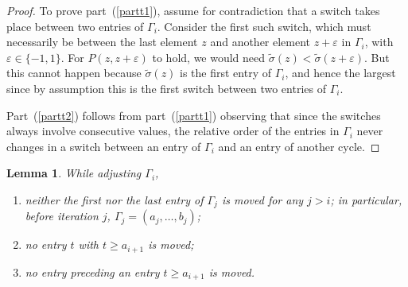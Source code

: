 \documentclass[11pt]{amsart}
\newtheorem{lemma}[theorem]{Lemma}
\newcommand\ben{\begin{enumerate}}
\newcommand\een{\end{enumerate}}
\newcommand\wt{\widetilde}
\newcommand\eps{\varepsilon}
\newcommand\sigm{\wt\sigma}
\begin{document}
\begin{proof}
To prove part~(\ref{partt1}), assume for contradiction that a switch takes place between two entries of $\Gamma_i$. Consider the first such switch, which must necessarily be
between the last element $z$ and another element $z+\eps$ in $\Gamma_i$, with $\eps\in\{-1,1\}$.
For $P(z,z+\eps)$ to hold, we would need $\sigm(z)<\sigm(z+\eps)$. But this cannot happen because $\sigm(z)$ is the first entry of $\Gamma_i$, and hence the largest since by assumption this is the first switch between two entries of $\Gamma_i$.

Part~(\ref{partt2}) follows from part~(\ref{partt1}) observing that since the switches always involve consecutive values,
the relative order of the entries in $\Gamma_i$ never changes in a switch between an entry of $\Gamma_i$ and an entry of another cycle.
\end{proof}

\begin{lemma}\label{lem:notmoved} While adjusting $\Gamma_i$, \ben
\item\label{part1} neither the first nor the last entry of $\Gamma_j$ is moved for any $j>i$; in particular, before iteration $j$, $\Gamma_j=(a_j,\dots,b_j)$;
\item\label{part2} no entry $t$ with $t\ge a_{i+1}$ is moved;
\item\label{part3} no entry preceding an entry $t\ge a_{i+1}$ is moved.
\een
\end{lemma}
\end{document}
